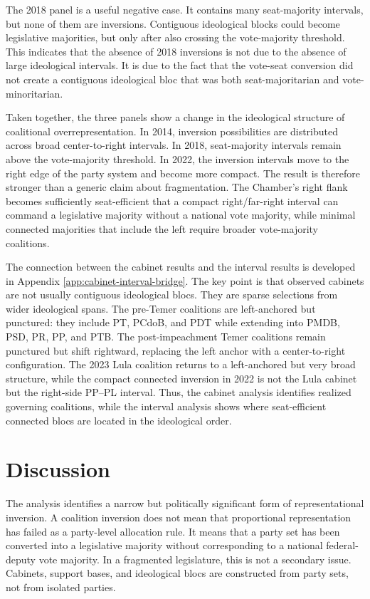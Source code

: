 \documentclass[11pt]{article}
\begin{document}
The 2018 panel is a useful negative case. It contains many seat-majority
intervals, but none of them are inversions. Contiguous ideological blocks could
become legislative majorities, but only after also crossing the vote-majority
threshold. This indicates that the absence of 2018 inversions is not due to the
absence of large ideological intervals. It is due to the fact that the vote-seat
conversion did not create a contiguous ideological bloc that was both
seat-majoritarian and vote-minoritarian.

Taken together, the three panels show a change in the ideological structure of
coalitional overrepresentation. In 2014, inversion possibilities are distributed
across broad center-to-right intervals. In 2018, seat-majority intervals remain
above the vote-majority threshold. In 2022, the inversion intervals move to the
right edge of the party system and become more compact. The result is
therefore stronger than a generic claim about fragmentation. The Chamber's
right flank becomes sufficiently seat-efficient that a compact right/far-right
interval can command a legislative majority without a national vote majority,
while minimal connected majorities that include the left require broader
vote-majority coalitions.


The connection between the cabinet results and the interval results is developed
in Appendix \ref{app:cabinet-interval-bridge}. The key point is that observed
cabinets are not usually contiguous ideological blocs. They are sparse selections
from wider ideological spans. The pre-Temer coalitions are left-anchored but
punctured: they include PT, PCdoB, and PDT while extending into PMDB, PSD,
PR, PP, and PTB. The post-impeachment Temer coalitions remain punctured but
shift rightward, replacing the left anchor with a center-to-right configuration.
The 2023 Lula coalition returns to a left-anchored but very broad structure,
while the compact connected inversion in 2022 is not the Lula cabinet but the
right-side PP--PL interval. Thus, the cabinet analysis identifies realized
governing coalitions, while the interval analysis shows where seat-efficient
connected blocs are located in the ideological order.

\section{Discussion}

The analysis identifies a narrow but politically significant form of
representational inversion. A coalition inversion does not mean that proportional
representation has failed as a party-level allocation rule. It means that a party
set has been converted into a legislative majority without corresponding to a
national federal-deputy vote majority. In a fragmented legislature, this is not a
secondary issue. Cabinets, support bases, and ideological blocs are constructed
from party sets, not from isolated parties.
\end{document}
